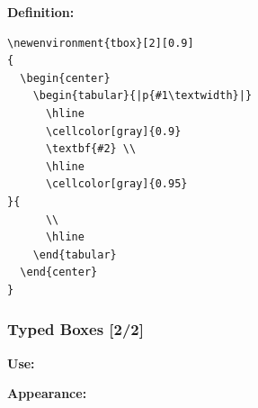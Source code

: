 {\begin{frame}[fragile]
  \vspace{5mm}
  \textbf{Definition:}
  \begin{verbatim}
\newenvironment{tbox}[2][0.9]
{
  \begin{center}
    \begin{tabular}{|p{#1\textwidth}|}
      \hline
      \cellcolor[gray]{0.9}
      \textbf{#2} \\
      \hline
      \cellcolor[gray]{0.95}
}{
      \\
      \hline
    \end{tabular}
  \end{center}
}
  \end{verbatim}
\end{frame}
\begin{frame}[fragile]
  \frametitle{Typed Boxes [2/2]}
  \vspace{3mm}
  \textbf{Use:}
  
  \vspace{5mm}
  \textbf{Appearance:}
\end{frame}

}


